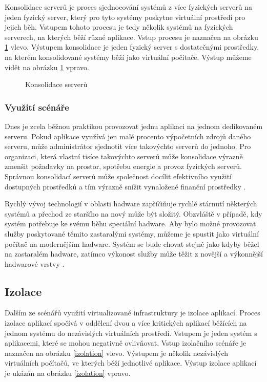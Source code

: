 Konsolidace serverů je proces sjednocování systémů z více fyzických serverů na jeden fyzický server, který pro tyto systémy poskytne virtuální prostředí pro jejich běh. Vstupem tohoto procesu je tedy několik systémů na fyzických serverech,
na kterých běží různé aplikace. Vstup procesu je naznačen na obrázku \ref{consolidation_img} vlevo. Výstupem konsolidace je jeden fyzický server s dostatečnými prostředky, na kterém konsolidované systémy běží jako virtuální počítače.
Výstup můžeme vidět na obrázku \ref{consolidation_img} vpravo.

\begin{figure}
    \centering    
    \caption{Konsolidace serverů}
    \label{consolidation_img}
\end{figure}

\subsubsection*{Využití scénáře}

Dnes je zcela běžnou praktikou provozovat jednu aplikaci na jednom dedikovaném serveru. Pokud aplikace využívá jen malé procento výpočetních zdrojů daného serveru, může administrátor sjednotit více takovýchto serverů
do jednoho. Pro organizaci, která vlastní tisíce takovýchto serverů může konsolidace výrazně zmenšit požadavky na prostor, spotřebu energie a provoz fyzických serverů. Správnou konsolidací serverů může společnost docílit
efektivního využití dostupných prostředků a tím výrazně snížit vynaložené finanční prostředky \cite{reasons}.

Rychlý vývoj technologií v oblasti hadware zapříčiňuje rychlé stárnutí některých systémů a přechod ze staršího na nový může být složitý. Obzvláště v případě, kdy systém potřebuje ke svému běhu speciální hadware.
Aby bylo možné provozovat služby poskytované těmito zastaralými systémy, můžeme je spustit jako virtuální počítač na modernějším hadware. Systém se bude chovat stejně jako kdyby běžel na zastaralém hadware, zatímco
výkonost služby může těžit z novější a výkonnější hadwarové vrstvy  \cite{reasons}.

\subsection{Izolace}

Dalším ze scénářů využití virtualizované infrastruktury je izolace aplikací. Proces izolace aplikací spočívá v oddělení dvou a více kritických aplikací běžících na jednom systému do nezávislých virtuálních prostředí.
Vstupem je jeden systém s aplikacemi, které se mohou negativně ovlivňovat. Vstup izolačního scénáře je naznačen na obrázku \ref{izolation} vlevo. Výstupem je několik nezávislých virtuálních počítačů, ve kterých běží
jednotlivé aplikace. Výstup izolace aplikací je ukázán na obrázku \ref{izolation} vpravo.


